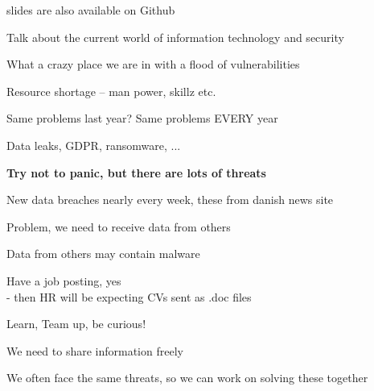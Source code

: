 \documentclass[Screen16to9,17pt]{foils}
\begin{document}


\vskip 1cm
\centerline{\footnotesize slides are also available on Github}




\begin{list1}
\item Talk about the current world of information technology and security
\item What a crazy place we are in with a flood of vulnerabilities
\item Resource shortage -- man power, skillz etc.
\end{list1}



\begin{list2}
\item Same problems last year? Same problems EVERY year
\item Data leaks, GDPR, ransomware, ...
\end{list2}

{\bf Try not to panic, but there are lots of threats}




New data breaches nearly every week, these from danish news site 

Problem, we need to receive data from others

Data from others may contain malware

Have a job posting, yes\\
- then HR will be expecting CVs sent as .doc files



\begin{list1}
\item Learn, Team up, be curious!
\item We need to share information freely
\item We often face the same threats, so we can work on solving these together
\end{list1}



\end{document}
